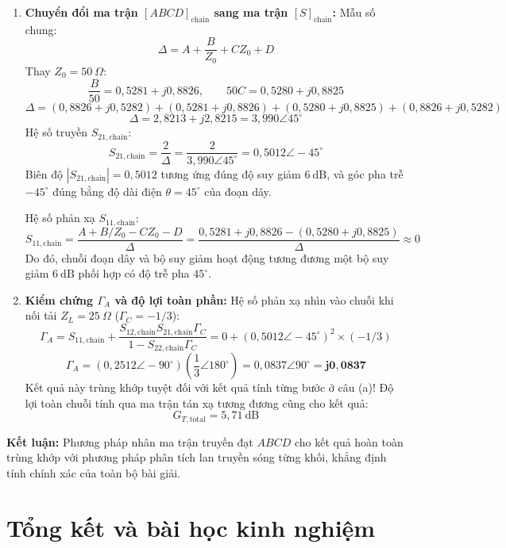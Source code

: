 \documentclass[12pt,a4paper]{article}
\begin{document}
\begin{enumerate}
    \item \textbf{Chuyển đổi ma trận $[ABCD]_{\text{chain}}$ sang ma trận $[S]_{\text{chain}}$:}
    Mẫu số chung:
    \[
    \Delta = A + \frac{B}{Z_0} + C Z_0 + D
    \]
    Thay $Z_0 = 50~\Omega$:
    \[
    \frac{B}{50} = 0{,}5281 + j0{,}8826, \qquad 50 C = 0{,}5280 + j0{,}8825
    \]
    \[
    \Delta = (0{,}8826 + j0{,}5282) + (0{,}5281 + j0{,}8826) + (0{,}5280 + j0{,}8825) + (0{,}8826 + j0{,}5282)
    \]
    \[
    \Delta = 2{,}8213 + j2{,}8215 = 3{,}990 \angle 45^\circ
    \]
    Hệ số truyền $S_{21,\text{chain}}$:
    \[
    S_{21,\text{chain}} = \frac{2}{\Delta} = \frac{2}{3{,}990 \angle 45^\circ} = 0{,}5012 \angle -45^\circ
    \]
    Biên độ $|S_{21,\text{chain}}| = 0{,}5012$ tương ứng đúng độ suy giảm $6~\text{dB}$, và góc pha trễ $-45^\circ$ đúng bằng độ dài điện $\theta = 45^\circ$ của đoạn dây.
    
    Hệ số phản xạ $S_{11,\text{chain}}$:
    \[
    S_{11,\text{chain}} = \frac{A + B/Z_0 - C Z_0 - D}{\Delta} = \frac{0{,}5281 + j0{,}8826 - (0{,}5280 + j0{,}8825)}{\Delta} \approx 0
    \]
    Do đó, chuỗi đoạn dây và bộ suy giảm hoạt động tương đương một bộ suy giảm $6~\text{dB}$ phối hợp có độ trễ pha $45^\circ$.
    \item \textbf{Kiểm chứng $\Gamma_A$ và độ lợi toàn phần:}
    Hệ số phản xạ nhìn vào chuỗi khi nối tải $Z_L = 25~\Omega$ ($\Gamma_C = -1/3$):
    \[
    \Gamma_A = S_{11,\text{chain}} + \frac{S_{12,\text{chain}}S_{21,\text{chain}}\Gamma_C}{1 - S_{22,\text{chain}}\Gamma_C} = 0 + (0{,}5012\angle -45^\circ)^2 \times (-1/3)
    \]
    \[
    \Gamma_A = (0{,}2512\angle -90^\circ) \left(\frac{1}{3}\angle 180^\circ\right) = 0{,}0837 \angle 90^\circ = \mathbf{j 0{,}0837}
    \]
    Kết quả này trùng khớp tuyệt đối với kết quả tính từng bước ở câu (a)!
    Độ lợi toàn chuỗi tính qua ma trận tán xạ tương đương cũng cho kết quả:
    \[
    G_{T,\text{total}} = 5{,}71~\text{dB}
    \]
\end{enumerate}
\textbf{Kết luận:} Phương pháp nhân ma trận truyền đạt $ABCD$ cho kết quả hoàn toàn trùng khớp với phương pháp phân tích lan truyền sóng từng khối, khẳng định tính chính xác của toàn bộ bài giải.

\newpage

\section*{Tổng kết và bài học kinh nghiệm}
\end{document}
